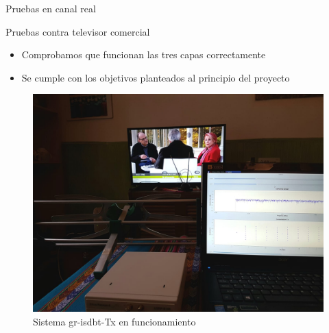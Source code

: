 \begin{frame}{Pruebas en canal real}
\begin{block}{Pruebas contra televisor comercial}
	\begin{itemize}	
		\item { Comprobamos que funcionan las tres capas correctamente  }
		\item { Se cumple con los objetivos planteados al principio del proyecto }
	\end{itemize}
\end{block}

	\begin{figure}
	\includegraphics[scale=0.11]{contra_tele}
	\caption{Sistema gr-isdbt-Tx en funcionamiento}
	\end{figure}

\end{frame}